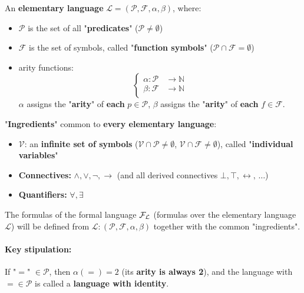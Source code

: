\begin{definition}
	An \textbf{elementary language} $\mathcal{L} = (\mathcal{P}, \mathcal{F}, \alpha, \beta)$, where: 
	\begin{itemize}
		\item $\mathcal{P}$ is the set of all "\textbf{predicates}" ($\mathcal{P} \neq \emptyset$)
		\item $\mathcal{F}$ is the set of symbols, called "\textbf{function symbols}" ($\mathcal{P} \cap \mathcal{F} = \emptyset$)
		\item arity functions: 
		$$
		\begin{cases}
			\alpha: \mathcal{P} & \rightarrow \mathbb{N} \\
			\beta: \mathcal{F} & \rightarrow \mathbb{N}\\
		\end{cases}
		$$
		$\alpha$ assigns the "\textbf{arity}" of \textbf{each} $p \in \mathcal{P}$, $\beta$ assigns the "\textbf{arity}" of \textbf{each} $f \in \mathcal{F}$.\\
	\end{itemize}
\end{definition}
	
"\textbf{Ingredients}" common to \textbf{every elementary language}:
\begin{itemize}
	\item $\mathcal{V}$: an \textbf{infinite set of symbols} ($\mathcal{V} \cap \mathcal{P} \neq \emptyset$, $\mathcal{V} \cap \mathcal{F} \neq \emptyset$), called "\textbf{individual variables}"
	\item \textbf{Connectives:} $\wedge, \vee, \neg, \rightarrow$ (and all derived connectives $\bot, \top, \leftrightarrow, \, \dots$)
	\item \textbf{Quantifiers:} $\forall, \exists$
\end{itemize}

The formulas of the formal language $\mathcal{F}_\mathcal{L}$ (formulas over the elementary language $\mathcal{L}$) will be defined from $\mathcal{L}: (\mathcal{P}, \mathcal{F}, \alpha, \beta)$ together with the common "ingredients".\\
	
\paragraph{Key stipulation:} If "$=$" $\in \mathcal{P}$, then $\alpha(=) = 2$ (its \textbf{arity is always 2}), and the language with $= \in \mathcal{P}$ is called a \textbf{language with identity}.\\

